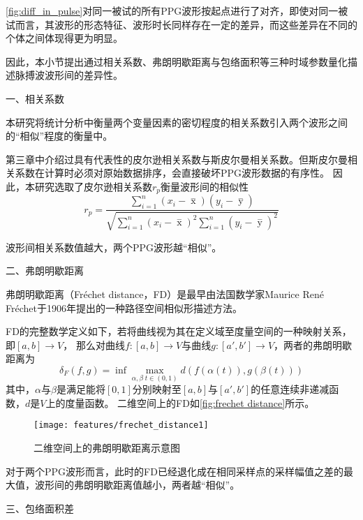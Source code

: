 \autoref{fig:diff_in_pulse}对同一被试的所有PPG波形按起点进行了对齐，即使对同一被试而言，其波形的形态特征、波形时长同样存在一定的差异，而这些差异在不同的个体之间体现得更为明显。

因此，本小节提出通过相关系数、弗朗明歇距离与包络面积等三种时域参数量化描述脉搏波波形间的差异性。

一、相关系数

本研究将统计分析中衡量两个变量因素的密切程度的相关系数引入两个波形之间的“相似”程度的衡量中。

第三章中介绍过具有代表性的皮尔逊相关系数与斯皮尔曼相关系数。但斯皮尔曼相关系数在计算时必须对原始数据排序，会直接破坏PPG波形数据的有序性。
因此，本研究选取了皮尔逊相关系数$r_p$衡量波形间的相似性
\begin{equation}
    \label{equ:pearson2}
    r_p=\frac{\sum_{i=1}^n{(x_i- \mathop{x} \limits^-)(y_i- \mathop{y} \limits^-)}}{\sqrt{{\sum_{i=1}^n}{{(x_i- \mathop{x} \limits^-)^2\sum_{i=1}^n}{(y_i- \mathop{y} \limits^-)^2}}}}
\end{equation}

波形间相关系数值越大，两个PPG波形越“相似”。

二、弗朗明歇距离

弗朗明歇距离（Fréchet distance，FD）是最早由法国数学家Maurice René Fréchet于1906年提出的一种路径空间相似形描述方法\cite{Wien1994,Kaveh2013,GN2017,derohde2022}。

FD的完整数学定义如下，若将曲线视为其在定义域至度量空间的一种映射关系，即$[a,b]\rightarrow V$，
那么对曲线$f:[a,b]\rightarrow V$与曲线$g:[a',b']\rightarrow V$，两者的弗朗明歇距离为
\begin{equation}
    \label{equ:frechet distance}
    \delta_F(f,g)=\inf \max \limits_{\alpha,\beta \; t \in (0,1)} d(f(\alpha(t)), g(\beta(t)))
\end{equation}
其中，$\alpha$与$\beta$是满足能将$[0,1]$分别映射至$[a,b]$与$[a',b']$的任意连续非递减函数，$d$是$V$上的度量函数\cite{Wien1994}。
二维空间上的FD如\autoref{fig:frechet distance}所示。
\begin{figure}[htbp]
  \centering
  \texttt{[image: features/frechet\_distance1]}
  \caption{\label{fig:frechet distance}二维空间上的弗朗明歇距离示意图}
\end{figure}

对于两个PPG波形而言，此时的FD已经退化成在相同采样点的采样幅值之差的最大值，波形间的弗朗明歇距离值越小，两者越“相似”。

三、包络面积差

